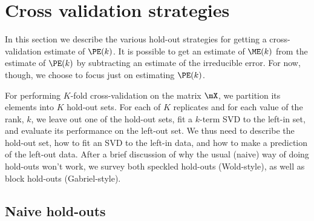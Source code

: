\section{Cross validation strategies}

In this section we describe the various hold-out strategies for getting a
cross-validation estimate of $\PE(k)$. It is possible to get an estimate of
$\ME(k)$ from the estimate of $\PE(k)$ by subtracting an estimate of the
irreducible error. For now, though, we choose to focus just on estimating
$\PE(k)$.

For performing $K$-fold cross-validation on the matrix $\mX$, we partition its
elements into $K$ hold-out sets. For each of $K$ replicates and for each value
of the rank, $k$, we leave out one of the hold-out sets, fit a $k$-term SVD to
the left-in set, and evaluate its performance on the left-out set. We thus
need to describe the hold-out set, how to fit an SVD to the left-in data, and
how to make a prediction of the left-out data. After a brief discussion of why
the usual (naive) way of doing hold-outs won't work, we survey both speckled
hold-outs (Wold-style), as well as block hold-outs (Gabriel-style).

\subsection{Naive hold-outs}

